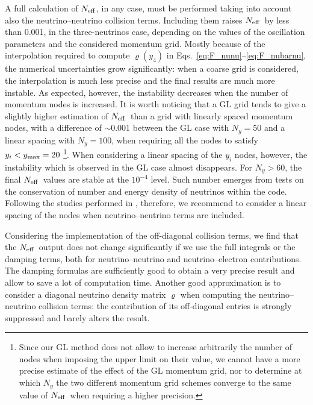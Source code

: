 \documentclass[notitlepage,nofootinbib,showpacs,preprintnumbers,amsmath,amssymb,superscriptaddress,prd,onecolumn]{revtex4-1}
\newcommand{\Neff}{\ensuremath{N_{\rm eff}}}
\begin{document}
A full calculation of \Neff, in any case, must be performed taking into account also the neutrino--neutrino collision terms.
Including them raises \Neff\ by less than 0.001, in the three-neutrinos case,
depending on the values of the oscillation parameters and the considered momentum grid.
Mostly because of the interpolation required to compute $\varrho(y_4)$
in Eqs.~\eqref{eq:F_nunu}--\eqref{eq:F_nubarnu},
the numerical uncertainties grow significantly:
when a coarse grid is considered, the interpolation is much less precise
and the final results are much more instable.
As expected, however, the instability decreases when the number of momentum nodes is increased.
It is worth noticing that a GL grid tends to give a slightly higher estimation of \Neff\
than a grid with linearly spaced momentum nodes, with a difference of $\sim0.001$
between the GL case with $N_y=50$ and a linear spacing with $N_y=100$,
when requiring all the nodes to satisfy $y_i<y_{\rm max}=20$%
\footnote{
Since our GL method does not allow to increase arbitrarily the number of nodes
when imposing the upper limit on their value,
we cannot have a more precise estimate of the effect of the GL momentum grid,
nor to determine at which $N_y$ the two different momentum grid schemes
converge to the same value of \Neff\ when requiring a higher precision.
}.
When considering a linear spacing of the $y_i$ nodes, however,
the instability which is observed in the GL case almost disappears.
For $N_y>60$, the final \Neff\ values are stable at the $10^{-4}$ level.
Such number emerges from tests on the conservation of number and energy density of neutrinos
within the code.
Following the studies performed in \cite{Bennett:2020zkv}, therefore,
we recommend to consider a linear spacing of the nodes when neutrino--neutrino terms
are included.

Considering the implementation of the off-diagonal collision terms,
we find that the \Neff\ output does not change significantly if we use the full integrals or the damping terms,
both for neutrino--neutrino and neutrino--electron contributions.
The damping formulas are sufficiently good to obtain a very precise result and allow to save
a lot of computation time.
Another good approximation is to consider a diagonal neutrino density matrix $\varrho$
when computing the neutrino--neutrino collision terms:
the contribution of its off-diagonal entries is strongly suppressed and barely alters the result.
\end{document}
